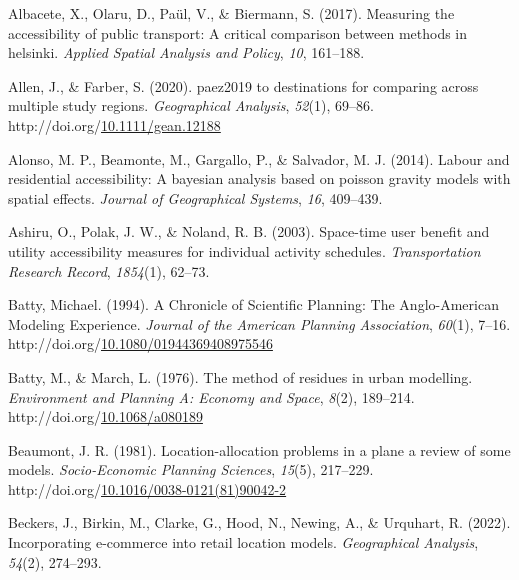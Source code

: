 \documentclass[
11pt, %
oneside, %
english, %
singlespacing, %
]{macthesis} %
\newlength{\cslhangindent}
\newenvironment{CSLReferences}[2] %
{\begin{list}{}{%
	\setlength{\itemindent}{0pt}
	\setlength{\leftmargin}{0pt}
	\setlength{\parsep}{0pt}
	\ifodd #1
	\setlength{\leftmargin}{\cslhangindent}
	\setlength{\itemindent}{-1\cslhangindent}
	\fi
	\setlength{\itemsep}{#2\baselineskip}}}
{\end{list}}
\begin{document}
\label{refs}
\begin{CSLReferences}{1}{0}
Albacete, X., Olaru, D., Paül, V., \& Biermann, S. (2017). Measuring the accessibility of public transport: A critical comparison between methods in helsinki. \emph{Applied Spatial Analysis and Policy}, \emph{10}, 161--188.

Allen, J., \& Farber, S. (2020). paez2019 to destinations for comparing across multiple study regions. \emph{Geographical Analysis}, \emph{52}(1), 69--86. http://doi.org/\href{https://doi.org/10.1111/gean.12188}{10.1111/gean.12188}

Alonso, M. P., Beamonte, M., Gargallo, P., \& Salvador, M. J. (2014). Labour and residential accessibility: A bayesian analysis based on poisson gravity models with spatial effects. \emph{Journal of Geographical Systems}, \emph{16}, 409--439.

Ashiru, O., Polak, J. W., \& Noland, R. B. (2003). Space-time user benefit and utility accessibility measures for individual activity schedules. \emph{Transportation Research Record}, \emph{1854}(1), 62--73.

Batty, Michael. (1994). A {Chronicle} of {Scientific} {Planning}: {The} {Anglo}-{American} {Modeling} {Experience}. \emph{Journal of the American Planning Association}, \emph{60}(1), 7--16. http://doi.org/\href{https://doi.org/10.1080/01944369408975546}{10.1080/01944369408975546}

Batty, M., \& March, L. (1976). The method of residues in urban modelling. \emph{Environment and Planning A: Economy and Space}, \emph{8}(2), 189--214. http://doi.org/\href{https://doi.org/10.1068/a080189}{10.1068/a080189}

Beaumont, J. R. (1981). Location-allocation problems in a plane a review of some models. \emph{Socio-Economic Planning Sciences}, \emph{15}(5), 217--229. http://doi.org/\href{https://doi.org/10.1016/0038-0121(81)90042-2}{10.1016/0038-0121(81)90042-2}

Beckers, J., Birkin, M., Clarke, G., Hood, N., Newing, A., \& Urquhart, R. (2022). Incorporating e-commerce into retail location models. \emph{Geographical Analysis}, \emph{54}(2), 274--293.


\end{CSLReferences}
\end{document}
